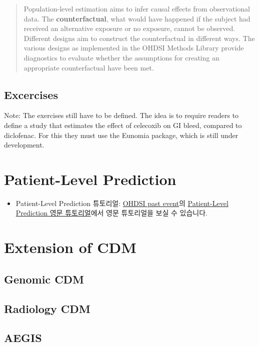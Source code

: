 \documentclass[]{book}
\providecommand{\tightlist}{%
  \setlength{\itemsep}{0pt}\setlength{\parskip}{0pt}}
\begin{document}
\begin{quote}
Population-level estimation aims to infer causal effects from observational data.
The \textbf{counterfactual}, what would have happened if the subject had received an alternative exposure or no exposure, cannot be observed.
Different designs aim to construct the counterfactual in different ways.
The various designs as implemented in the OHDSI Methods Library provide diagnostics to evaluate whether the assumptions for creating an appropriate counterfactual have been met.
\end{quote}

\hypertarget{excercises}{%
\section{Excercises}\label{excercises}}

Note: The exercises still have to be defined. The idea is to require readers to define a study that estimates the effect of celecoxib on GI bleed, compared to diclofenac. For this they must use the Eunomia package, which is still under development.

\hypertarget{patient-level-prediction}{%
\chapter{Patient-Level Prediction}\label{patient-level-prediction}}

\begin{itemize}
\tightlist
\item
  Patient-Level Prediction 튜토리얼: \href{https://www.ohdsi.org/past-events/}{OHDSI past event}의 \href{https://www.ohdsi.org/past-events/patient-level-prediction}{Patient-Level Prediction 영문 튜토리얼}에서 영문 튜토리얼을 보실 수 있습니다.
\end{itemize}

\hypertarget{extension-of-cdm}{%
\chapter{Extension of CDM}\label{extension-of-cdm}}

\hypertarget{genomic-cdm}{%
\section{Genomic CDM}\label{genomic-cdm}}

\hypertarget{radiology-cdm}{%
\section{Radiology CDM}\label{radiology-cdm}}

\hypertarget{aegis}{%
\section{AEGIS}\label{aegis}}


\end{document}
